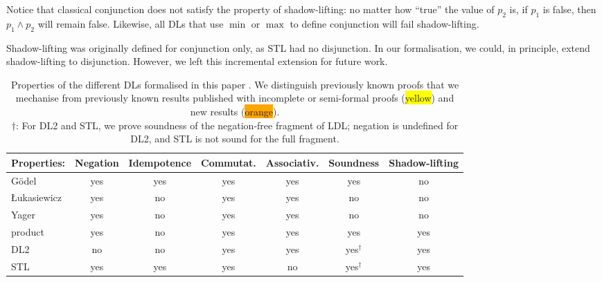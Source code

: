 \documentclass[a4paper,UKenglish,cleveref, autoref, thm-restate]{lipics-v2021}
\def\DLtwo{\textrm{DL2}}
\def\STL{\textrm{STL}}
\def\product{\textrm{product}}
\def\Yager{\textrm{Yager}}
\def\Luka{\textrm{Łukasiewicz}}
\def\Godel{\textrm{Gödel}}
\begin{document}
\noindent Notice that classical conjunction does not satisfy the
property of shadow-lifting: no matter how ``true'' the value of $p_2$ is, if $p_1$ is
false, then $p_1 \land p_2$ will remain false. Likewise, all DLs that use $\min$ or
$\max$ to define conjunction will fail shadow-lifting.

Shadow-lifting was originally defined for conjunction only, as \STL{} had no 
disjunction. 
In our formalisation, we could, in principle, extend shadow-lifting to disjunction.
However, we left this incremental extension for future work.    

\begin{table}[t]
{\footnotesize
	\begin{tabular}{|p{}|c|c|c|c|c|c|}
		\hline 
		\textbf{Properties:} &  Negation & Idempotence & Commutat. & Associativ. & Soundness & Shadow-lifting  \\ 
		\hline 

		   \Godel & yes & yes & yes & yes  & yes & no \\
		\hline 

		\Luka & yes &no & yes & yes  & no& no \\
		\hline 
		\Yager  & yes  & no & yes &yes & no & no 
		\\
		\hline 
		\product  &yes & no &yes &yes & yes & \cellcolor{orange} yes \\
		\hline

		\DLtwo  & no &  no &  \cellcolor{orange} yes & 
		\cellcolor{orange} yes & \cellcolor{yellow} yes$^\dagger$  & 
		 \cellcolor{orange} yes
		\\
		\hline 			
		\STL   & yes &yes &yes & no & 
		\cellcolor{orange} yes$^\dagger$ & \cellcolor{yellow} yes \\
		\hline 
	\end{tabular}}
	
			\caption{Properties of the different DLs formalised in this paper \cite{github}. We distinguish previously known proofs that we mechanise from
			previously known results published with incomplete or
				semi-formal proofs (\colorbox{yellow}{yellow}) and new results (\colorbox{orange}{orange}).\\
 {\footnotesize $\dag$: For \DLtwo{} and \STL{}, we prove soundness of the
  negation-free fragment of LDL; negation
 is undefined for \DLtwo, and \STL{} is not sound for the
 full fragment.}}
\label{tab:properties}
\setlength{\belowcaptionskip}{-15pt}
\vspace*{-1em}
\end{table}
\end{document}
